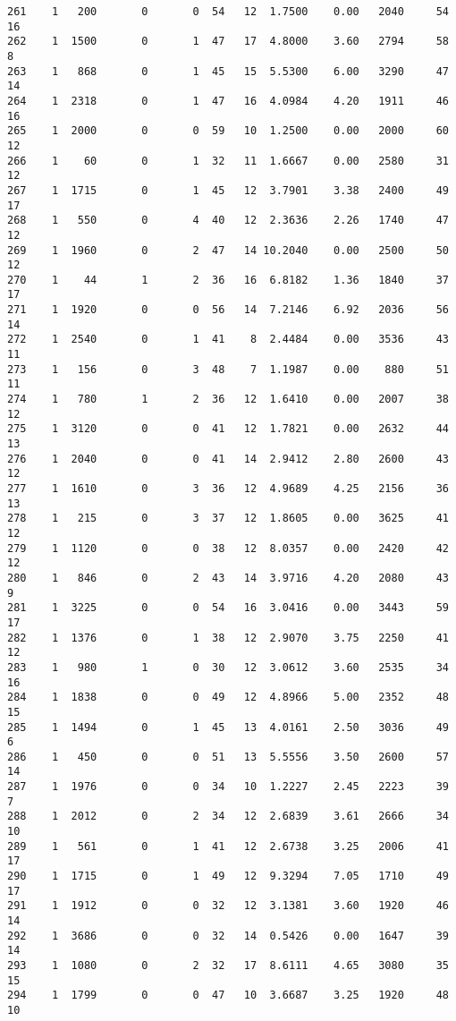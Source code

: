 \documentclass[
  letterpaper,
  DIV=11,
  numbers=noendperiod]{scrreprt}
\begin{document}
\begin{verbatim}
261    1   200       0       0  54   12  1.7500    0.00   2040     54      16
262    1  1500       0       1  47   17  4.8000    3.60   2794     58       8
263    1   868       0       1  45   15  5.5300    6.00   3290     47      14
264    1  2318       0       1  47   16  4.0984    4.20   1911     46      16
265    1  2000       0       0  59   10  1.2500    0.00   2000     60      12
266    1    60       0       1  32   11  1.6667    0.00   2580     31      12
267    1  1715       0       1  45   12  3.7901    3.38   2400     49      17
268    1   550       0       4  40   12  2.3636    2.26   1740     47      12
269    1  1960       0       2  47   14 10.2040    0.00   2500     50      12
270    1    44       1       2  36   16  6.8182    1.36   1840     37      17
271    1  1920       0       0  56   14  7.2146    6.92   2036     56      14
272    1  2540       0       1  41    8  2.4484    0.00   3536     43      11
273    1   156       0       3  48    7  1.1987    0.00    880     51      11
274    1   780       1       2  36   12  1.6410    0.00   2007     38      12
275    1  3120       0       0  41   12  1.7821    0.00   2632     44      13
276    1  2040       0       0  41   14  2.9412    2.80   2600     43      12
277    1  1610       0       3  36   12  4.9689    4.25   2156     36      13
278    1   215       0       3  37   12  1.8605    0.00   3625     41      12
279    1  1120       0       0  38   12  8.0357    0.00   2420     42      12
280    1   846       0       2  43   14  3.9716    4.20   2080     43       9
281    1  3225       0       0  54   16  3.0416    0.00   3443     59      17
282    1  1376       0       1  38   12  2.9070    3.75   2250     41      12
283    1   980       1       0  30   12  3.0612    3.60   2535     34      16
284    1  1838       0       0  49   12  4.8966    5.00   2352     48      15
285    1  1494       0       1  45   13  4.0161    2.50   3036     49       6
286    1   450       0       0  51   13  5.5556    3.50   2600     57      14
287    1  1976       0       0  34   10  1.2227    2.45   2223     39       7
288    1  2012       0       2  34   12  2.6839    3.61   2666     34      10
289    1   561       0       1  41   12  2.6738    3.25   2006     41      17
290    1  1715       0       1  49   12  9.3294    7.05   1710     49      17
291    1  1912       0       0  32   12  3.1381    3.60   1920     46      14
292    1  3686       0       0  32   14  0.5426    0.00   1647     39      14
293    1  1080       0       2  32   17  8.6111    4.65   3080     35      15
294    1  1799       0       0  47   10  3.6687    3.25   1920     48      10

\end{verbatim}
\end{document}

